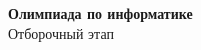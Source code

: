 \documentclass[12pt,a4paper]{article}
\begin{document}
\begin{center}
  {\LARGE \textbf{Олимпиада по информатике}}\\[0.5cm]
  {\large Отборочный этап}\\
  \vspace{0.5cm}
\end{center}


\newpage

\newpage

\newpage

\newpage

\end{document}
